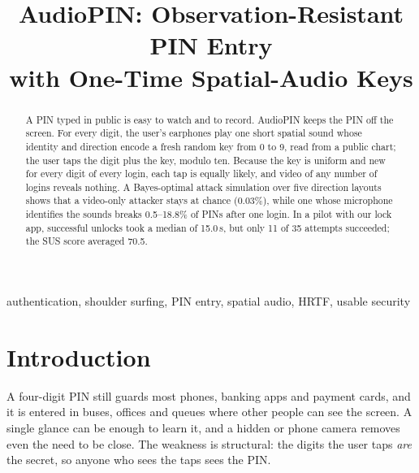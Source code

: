 \documentclass[conference]{IEEEtran}
\begin{document}
\title{AudioPIN: Observation-Resistant PIN Entry\\with One-Time Spatial-Audio Keys}

\author{
\and
{}
}

\maketitle

\begin{abstract}
A PIN typed in public is easy to watch and to record. AudioPIN keeps the PIN off the screen. For every
digit, the user's earphones play one short spatial sound whose identity and direction encode a fresh
random key from 0 to 9, read from a public chart; the user taps the digit plus the key, modulo ten.
Because the key is uniform and new for every digit of every login, each tap is equally likely, and video
of any number of logins reveals nothing. A Bayes-optimal attack simulation over five direction layouts
shows that a video-only attacker stays at chance (0.03\%), while one whose microphone identifies the
sounds breaks 0.5--18.8\% of PINs after one login. In a pilot with our lock app, successful unlocks took
a median of 15.0\,s, but only 11 of 35 attempts succeeded; the SUS score averaged 70.5.
\end{abstract}

\begin{IEEEkeywords}
authentication, shoulder surfing, PIN entry, spatial audio, HRTF, usable security
\end{IEEEkeywords}

\section{Introduction}
A four-digit PIN still guards most phones, banking apps and payment cards, and it is entered in buses,
offices and queues where other people can see the screen. A single glance can be enough to learn it,
and a hidden or phone camera removes even the need to be close. The weakness is structural: the digits
the user taps \emph{are} the secret, so anyone who sees the taps sees the PIN.
\end{document}
